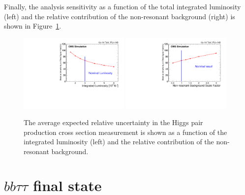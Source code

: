 Finally, the analysis sensitivity as a function of the total integrated luminosity (left) and the relative contribution of the non-resonant background (right) is shown in Figure~\ref{fig:LumiScan}.

\begin{figure}[h]
  \centering
  \includegraphics[width=0.48\textwidth]{figures_chapter6/XSUncertaintyVsLumi.pdf}
 \includegraphics[width=0.48\textwidth]{figures_chapter6/XSUncertaintyVsNonResBkgScaleFactor.pdf} 
  \caption {The average expected relative uncertainty in the Higgs pair production cross section measurement is shown  as a function of the integrated luminosity (left) and the relative contribution of the non-resonant background.}
  \label{fig:LumiScan}
\end{figure}


\section{$bb\tau\tau$ final state}

